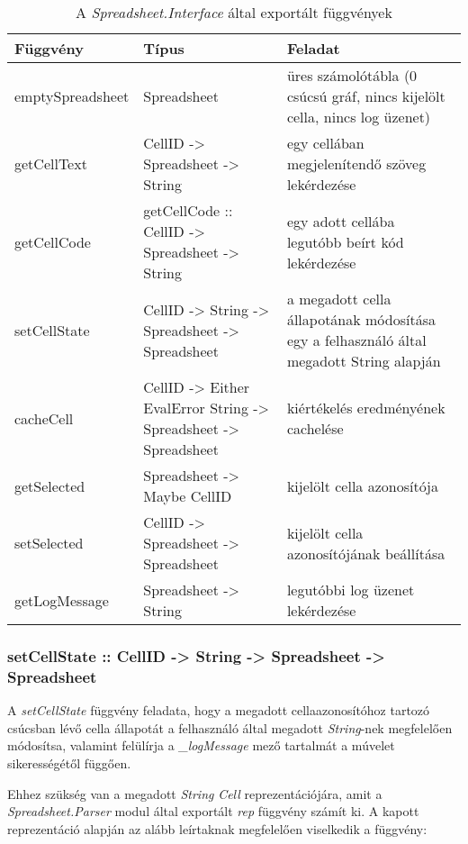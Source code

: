 \begin{table}
	\centering
	\begin{tabularx}{\textwidth}{ |l|X|X|}
		\hline
		Függvény & Típus & Feladat \\
		\hline\hline
		emptySpreadsheet & Spreadsheet & üres számolótábla (0 csúcsú gráf, nincs kijelölt cella, nincs log üzenet) \\
		\hline
		getCellText & CellID -> Spreadsheet -> String & egy cellában megjelenítendő szöveg lekérdezése \\
		\hline
		getCellCode & getCellCode :: CellID -> Spreadsheet -> String & egy adott cellába legutóbb beírt kód lekérdezése \\
		\hline
		setCellState & CellID -> String -> Spreadsheet -> Spreadsheet & a megadott cella állapotának módosítása egy a felhasználó által megadott String alapján \\
		\hline
		cacheCell & CellID -> Either EvalError String -> Spreadsheet -> Spreadsheet & kiértékelés eredményének cachelése \\
		\hline
		getSelected & Spreadsheet -> Maybe CellID & kijelölt cella azonosítója \\
		\hline
		setSelected & CellID -> Spreadsheet -> Spreadsheet & kijelölt cella azonosítójának beállítása \\
		\hline 
		getLogMessage & Spreadsheet -> String & legutóbbi log üzenet lekérdezése \\
		\hline
	\end{tabularx}
	\caption[A \textit{Spreadsheet.Interface} által exportált függvények]{A \textit{Spreadsheet.Interface} által exportált függvények}
	\label{tab:interface}
\end{table}

\subsubsection{setCellState :: CellID -> String -> Spreadsheet -> Spreadsheet}

A \textit{setCellState} függvény feladata, hogy a megadott cellaazonosítóhoz tartozó csúcsban lévő cella állapotát a felhasználó által megadott \textit{String}-nek megfelelően módosítsa, valamint felülírja a \textit{\_logMessage} mező tartalmát a múvelet sikerességétől függően.

Ehhez szükség van a megadott \textit{String} \textit{Cell} reprezentációjára, amit a \textit{Spreadsheet.Parser} modul által exportált \textit{rep} függvény számít ki. A kapott reprezentáció alapján az alább leírtaknak megfelelően viselkedik a függvény:


